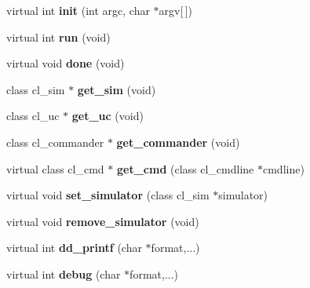 \begin{DoxyCompactItemize}
\item 
\hypertarget{classcl__app_af1ae3d613ed5a8cfeee50768f23f0d18}{
virtual int {\bfseries init} (int argc, char $\ast$argv\mbox{[}$\,$\mbox{]})}
\label{classcl__app_af1ae3d613ed5a8cfeee50768f23f0d18}

\item 
\hypertarget{classcl__app_aafdec4ecc1592f745766da411de937dd}{
virtual int {\bfseries run} (void)}
\label{classcl__app_aafdec4ecc1592f745766da411de937dd}

\item 
\hypertarget{classcl__app_a1f2caf1fbc15c4f2d8100f973f6ab909}{
virtual void {\bfseries done} (void)}
\label{classcl__app_a1f2caf1fbc15c4f2d8100f973f6ab909}

\item 
\hypertarget{classcl__app_adbf148a46af4915fa533c8483f67f9df}{
class cl\_\-sim $\ast$ {\bfseries get\_\-sim} (void)}
\label{classcl__app_adbf148a46af4915fa533c8483f67f9df}

\item 
\hypertarget{classcl__app_a22097a1116d7ebaff1142ad200f95a0e}{
class cl\_\-uc $\ast$ {\bfseries get\_\-uc} (void)}
\label{classcl__app_a22097a1116d7ebaff1142ad200f95a0e}

\item 
\hypertarget{classcl__app_ac22477ce4a85ab0ef94188d130f890a5}{
class cl\_\-commander $\ast$ {\bfseries get\_\-commander} (void)}
\label{classcl__app_ac22477ce4a85ab0ef94188d130f890a5}

\item 
\hypertarget{classcl__app_a4a3f00592cc63fa5736e3bba1557c566}{
virtual class cl\_\-cmd $\ast$ {\bfseries get\_\-cmd} (class cl\_\-cmdline $\ast$cmdline)}
\label{classcl__app_a4a3f00592cc63fa5736e3bba1557c566}

\item 
\hypertarget{classcl__app_a6add6e2648d57e7d7383b9320179c74b}{
virtual void {\bfseries set\_\-simulator} (class cl\_\-sim $\ast$simulator)}
\label{classcl__app_a6add6e2648d57e7d7383b9320179c74b}

\item 
\hypertarget{classcl__app_acd888273e848fe87151e0781da93895f}{
virtual void {\bfseries remove\_\-simulator} (void)}
\label{classcl__app_acd888273e848fe87151e0781da93895f}

\item 
\hypertarget{classcl__app_a0a68e3a0beb3daa59a166bd1578383fe}{
virtual int {\bfseries dd\_\-printf} (char $\ast$format,...)}
\label{classcl__app_a0a68e3a0beb3daa59a166bd1578383fe}

\item 
\hypertarget{classcl__app_a52bed4fba7c628a661e0455a2e091863}{
virtual int {\bfseries debug} (char $\ast$format,...)}
\label{classcl__app_a52bed4fba7c628a661e0455a2e091863}

\end{DoxyCompactItemize}
